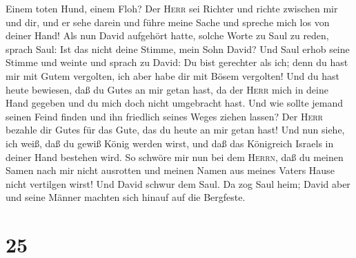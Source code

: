 Einem toten Hund, einem Floh?  Der \textsc{Herr} sei
Richter und richte zwischen mir und dir, und er sehe darein und führe
meine Sache und spreche mich los von deiner Hand!  Als
nun David aufgehört hatte, solche Worte zu Saul zu reden, sprach Saul:
Ist das nicht deine Stimme, mein Sohn David? Und Saul erhob seine Stimme
und weinte  und sprach zu David: Du bist gerechter als
ich; denn du hast mir mit Gutem vergolten, ich aber habe dir mit Bösem
vergolten!  Und du hast heute bewiesen, daß du Gutes an
mir getan hast, da der \textsc{Herr} mich in deine Hand gegeben und du
mich doch nicht umgebracht hast.  Und wie sollte jemand
seinen Feind finden und ihn friedlich seines Weges ziehen lassen? Der
\textsc{Herr} bezahle dir Gutes für das Gute, das du heute an mir getan
hast!  Und nun siehe, ich weiß, daß du gewiß König werden
wirst, und daß das Königreich Israels in deiner Hand bestehen wird.
 So schwöre mir nun bei dem \textsc{Herrn}, daß du meinen
Samen nach mir nicht ausrotten und meinen Namen aus meines Vaters Hause
nicht vertilgen wirst!  Und David schwur dem Saul. Da zog
Saul heim; David aber und seine Männer machten sich hinauf auf die
Bergfeste.

\hypertarget{section-24}{%
\section{25}\label{section-24}}

